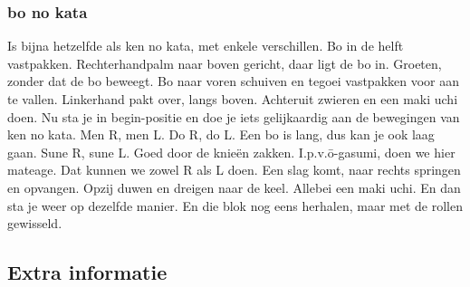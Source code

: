 \subsubsection{bo no kata}
Is bijna hetzelfde als ken no kata, met enkele verschillen.
Bo in de helft vastpakken. Rechterhandpalm naar boven gericht, daar ligt de bo in.
Groeten, zonder dat de bo beweegt.
Bo naar voren schuiven en tegoei vastpakken voor aan te vallen. Linkerhand pakt over, langs boven. Achteruit zwieren en een maki uchi doen. Nu sta je in begin-positie en doe je iets gelijkaardig aan de bewegingen van ken no kata.
Men R, men L.
Do R, do L.
Een bo is lang, dus kan je ook laag gaan.
Sune R, sune L. Goed door de knie\"{e}n zakken.
I.p.v.\={o}-gasumi, doen we hier mateage. Dat kunnen we zowel R als L doen.
Een slag komt, naar rechts springen en opvangen. Opzij duwen en dreigen naar de keel.
Allebei een maki uchi. En dan sta je weer op dezelfde manier.
En die blok nog eens herhalen, maar met de rollen gewisseld.

\subsection{Extra informatie}
